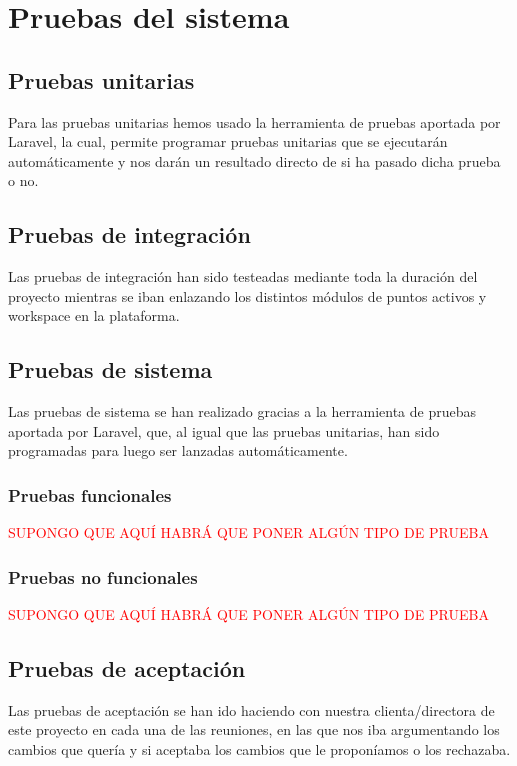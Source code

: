 \chapter{Pruebas del sistema}
\section{Pruebas unitarias}
Para las pruebas unitarias hemos usado la herramienta de pruebas aportada por Laravel, la cual, permite programar pruebas unitarias que se ejecutarán automáticamente y nos darán un resultado directo de si ha pasado dicha prueba o no.

\section{Pruebas de integración}
Las pruebas de integración han sido testeadas mediante toda la duración del proyecto mientras se iban enlazando los distintos módulos de puntos activos y workspace en la plataforma.

\section{Pruebas de sistema}
Las pruebas de sistema se han realizado gracias a la herramienta de pruebas aportada por Laravel, que, al igual que las pruebas unitarias, han sido programadas para luego ser lanzadas automáticamente.

\subsection{Pruebas funcionales}
\textcolor{red}{SUPONGO QUE AQUÍ HABRÁ QUE PONER ALGÚN TIPO DE PRUEBA}

\subsection{Pruebas no funcionales}
\textcolor{red}{SUPONGO QUE AQUÍ HABRÁ QUE PONER ALGÚN TIPO DE PRUEBA}

\section{Pruebas de aceptación}
Las pruebas de aceptación se han ido haciendo con nuestra clienta/directora de este proyecto en cada una de las reuniones, en las que nos iba argumentando los cambios que quería y si aceptaba los cambios que le proponíamos o los rechazaba.